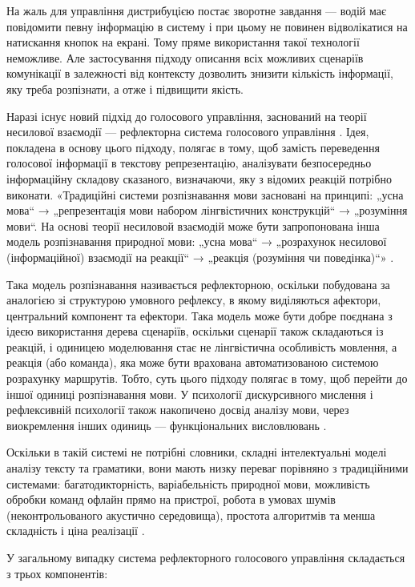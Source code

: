На жаль для управління дистрибуцією постає зворотне завдання — водій має повідомити певну інформацію в систему і при цьому не повинен відволікатися на натискання кнопок на екрані. Тому пряме використання такої технології неможливе. Але застосування підходу описання всіх можливих сценаріїв комунікації в залежності від контексту дозволить знизити кількість інформації, яку треба розпізнати, а отже і підвищити якість.

Наразі існує новий підхід до голосового управління, заснований на теорії несилової взаємодії \cite{Teslia_2010} — рефлекторна система голосового управління \cite{Egorchenkov_2016}. Ідея, покладена в основу цього підходу, полягає в тому, щоб замість переведення голосової інформації в текстову репрезентацію, аналізувати безпосередньо інформаційну складову сказаного, визначаючи, яку з відомих реакцій потрібно виконати. «Традиційні системи розпізнавання мови засновані на принципі: „усна мова“ → „репрезентація мови набором лінгвістичних конструкцій“ → „розуміння мови“. На основі теорії несиловой взаємодій може бути запропонована інша модель розпізнавання природної мови: „усна мова“ → „розрахунок несилової (інформаційної) взаємодії на реакції“ → „реакція (розуміння чи поведінка)“» \cite{Teslia_2014}.

Така модель розпізнавання називається рефлекторною, оскільки побудована за аналогією зі структурою умовного рефлексу, в якому виділяються афектори, центральний компонент та ефектори. Така модель може бути добре поєднана з ідеєю використання дерева сценаріїв, оскільки сценарії також складаються із реакцій, і одиницею моделювання стає не лінгвістична особливість мовлення, а реакція (або команда), яка може бути врахована автоматизованою системою розрахунку маршрутів. Тобто, суть цього підходу полягає в тому, щоб перейти до іншої одиниці розпізнавання мови. У психології дискурсивного мислення і рефлексивній психології також накопичено досвід аналізу мови, через виокремлення інших одиниць — функціональних висловлювань \cite{Naydonov_2008}.

Оскільки в такій системі не потрібні словники, складні інтелектуальні моделі аналізу тексту та граматики, вони мають низку переваг порівняно з традиційними системами: багатодикторність, варіабельність природної мови, можливість обробки команд офлайн прямо на пристрої, робота в умовах шумів (неконтрольованого акустично середовища), простота алгоритмів та менша складність і ціна реалізації \cite{Teslia_2013}.

У загальному випадку система рефлекторного голосового управління складається з трьох компонентів:

